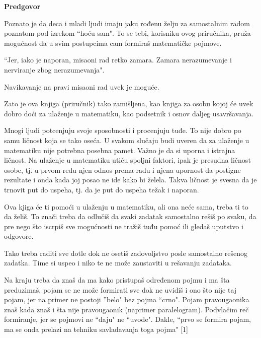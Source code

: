 {\noindent \bfseries \Huge Predgovor}
\begin{center}
    \thispagestyle{plain}
\end{center}%

Poznato je da deca i mladi ljudi imaju jaku rođenu želju za samostalnim radom poznatom pod
izrekom ``hoću sam". To se tebi, korisniku ovog priručnika, pruža mogućnost da u svim postupcima
cam formiraš matematičke pojmove.

``Jer, iako je naporan, misaoni rad retko zamara. Zamara nerazumevanje i nerviranje zbog nerazumevanja".

Navikavanje na pravi misaoni rad uvek je moguće.

Zato je ova knjiga (priručnik) tako zamišljena, kao knjiga za osobu kojoj će uvek dobro doći za ulaženje u
matematiku, kao podsetnik i osnov daljeg usavršavanja.

Mnogi ljudi potcenjuju svoje sposobnosti i procenjuju tuđe. To nije dobro po samu ličnost koja se tako oseća.
U svakom slučaju budi uveren da za ulaženje u matematiku nije potrebna posebna pamet. Važno je da si uporna i
istrajna ličnost. Na ulaženje u matematiku utiču spoljni faktori, ipak je presudna ličnost osobe, tj. u prvom
redu njen odnos prema radu i njena upornost da postigne rezultate i onda kada joj posao ne ide kako bi želela.
Takva ličnost je svesna da je trnovit put do uspeha, tj. da je put do uspeha težak i naporan.

Ova kjiga će ti pomoći u ulaženju u matematiku, ali ona neće sama, treba ti to da želiš. To znači
treba da odlučiš da svaki zadatak samostalno rešiš po svaku, da pre nego što iscrpiš sve mogućnosti ne tražiš
tuđu pomoć ili gledaš uputstvo i odgovore.

Tako treba raditi sve dotle dok ne osetiš zadovoljstvo posle samostalno rešenog zadatka. Time si uspeo i niko
te ne može zaustaviti u rešavanju zadataka.

Na kraju treba da znaš da ma kako pristupaš određenom pojmu i ma šta preduzimaš, pojam se ne može formirati sve
dok ne uvidiš i ono što nije taj pojam, jer na primer ne postoji ''belo" bez pojma ``crno". Pojam
pravougaonika znaš kada znaš i šta nije pravougaonik (naprimer paralelogram). Podvlačim reč formiranje, jer
se pojmovi ne ``daju" ne ``uvode". Dakle, ``prvo se formira pojam, ma se onda prelazi na tehniku
savladavanja toga pojma" [1] %

